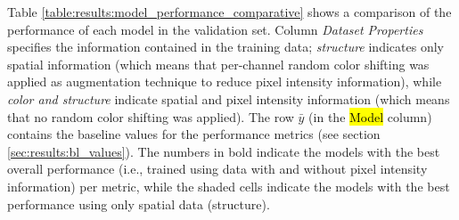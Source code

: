 
\glsresetall
\graphicspath{{./Sections/Results/Resources/}}

Table \ref{table:results:model_performance_comparative} shows a comparison of the performance of each model in the validation set. Column \textit{Dataset Properties} specifies the information contained in the training data; \textit{structure} indicates only spatial information (which means that per-channel random color shifting was applied as augmentation technique to reduce pixel intensity information), while \textit{color and structure} indicate spatial and pixel intensity information (which means that no random color shifting was applied). The row $\bar{y}$ (in the \hl{Model} column) contains the baseline values for the performance metrics (see section \ref{sec:results:bl_values}). The numbers in bold indicate the models with the best overall performance (i.e., trained using data with and without pixel intensity information) per metric, while the shaded cells indicate the models with the best performance using only spatial data (structure).

\setlength{\mylinewidth}{\linewidth-7pt}%
\setlength{\mylengtha}{0.17\mylinewidth-2\arraycolsep}%
\setlength{\mylengthb}{0.2\mylinewidth-2\arraycolsep}%
\setlength{\mylengthc}{0.1\mylinewidth-2\arraycolsep}%
\setlength{\mylengthd}{0.1\mylinewidth-2\arraycolsep}%
\setlength{\mylengthe}{0.08\mylinewidth-2\arraycolsep}%
\setlength{\mylengthf}{0.09\mylinewidth-2\arraycolsep}%
\setlength{\mylengthg}{0.1\mylinewidth-2\arraycolsep}%
\setlength{\mylengthh}{0.1\mylinewidth-2\arraycolsep}%


